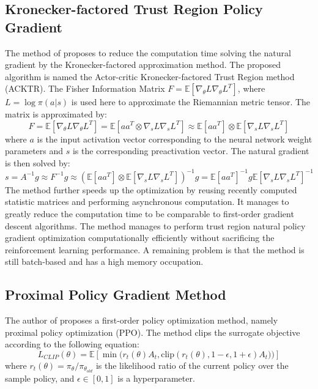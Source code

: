\subsection{Kronecker-factored Trust Region Policy Gradient}
The method of \cite{wu2017scalable} proposes to reduce the computation time solving the natural gradient by the Kronecker-factored approximation method. The proposed algorithm is named the Actor-critic  Kronecker-factored Trust Region method (ACKTR).
The Fisher Information Matrix $F=\mathbb{E}[\nabla_\theta L \nabla_\theta L^T]$, where $L=\log\pi(a|s)$ is used here to approximate the Riemannian metric tensor.
The matrix is approximated by:
\begin{equation*}
    F=\mathbb{E}[\nabla_\theta L \nabla_\theta L^T] = \mathbb{E}[aa^T \otimes \nabla_s L \nabla_s L^T ] 
    \approx \mathbb{E}[aa^T] \otimes \mathbb{E}[\nabla_s L \nabla_s L^T ] 
\end{equation*}
where $a$ is the input activation vector corresponding to the neural network weight parameters and $s$ is the corresponding preactivation vector.
The natural gradient is then solved by:
\begin{equation}
    s=A^{-1}g \approx F^{-1}g \approx \left(\mathbb{E}[aa^T] \otimes \mathbb{E}[\nabla_s L \nabla_s L^T ] \right)^{-1}g = \mathbb{E}[aa^T]^{-1} g  \mathbb{E}[\nabla_s L \nabla_s L^T ]^{-1}
\end{equation}
The method further speeds up the optimization by reusing recently computed statistic matrices and performing asynchronous computation. It manages to greatly reduce the computation time to be comparable to first-order gradient descent algorithms.
The method manages to perform trust region natural policy gradient optimization computationally efficiently without sacrificing the reinforcement learning performance. A remaining problem is that the method is still batch-based and has a high memory occupation.

\subsection{Proximal Policy Gradient Method}
The author of \cite{schulman2017proximal} proposes a first-order policy optimization method, namely proximal policy optimization (PPO). The method clips the surrogate objective according to the following equation:
\begin{equation}
    L_{CLIP}(\theta) = \mathbb{E} \left[ \min\big(r_t(\theta) A_t , \mathrm{clip}(r_t(\theta),1-\epsilon,1+\epsilon)A_t)\big) \right]
\end{equation}
where $r_t(\theta) = \pi_\theta / \pi_{\theta_{old}}$ is the likelihood ratio of the current policy over the sample policy, and $\epsilon \in [0,1]$ is a hyperparameter. 

